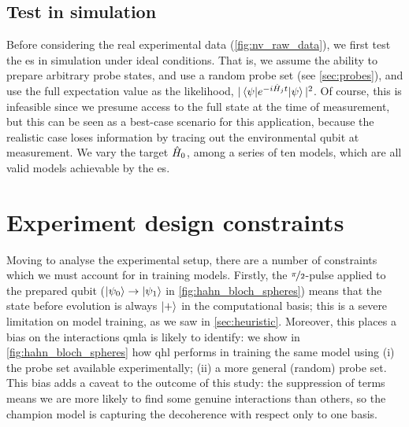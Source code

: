 \par 
\subsection{Test in simulation}
Before considering the real experimental data (\cref{fig:nv_raw_data}), 
    we first test the \gls{es} in simulation under ideal conditions. 
That is, we assume the ability to prepare arbitrary \gls{probe} states, 
    and use a random \gls{probe} set (see \cref{sec:probes}),
    and use the full expectation value as the likelihood, $|\braket{\psi | e^{-i \hat{H}_j t} | \psi}|^2$.
Of course, this is infeasible since we presume access to the full state at the time of measurement, 
    but this can be seen as a best-case scenario for this application, 
    because the realistic case loses information by tracing out the environmental qubit at measurement.
We vary the target $\hat{H}_0$, among a series of ten models,
    which are all valid models achievable by the \gls{es}. 


\section{Experiment design constraints}\label{sec:nv_constraints}
Moving to analyse the experimental setup, there are a number of constraints which we must account for in 
    training models. 
Firstly, the $\nicefrac{\pi}{2}$-pulse applied to the prepared qubit ($\ket{\psi_0} \rightarrow \ket{\psi_1}$ in \cref{fig:hahn_bloch_spheres})
    means that the state before evolution is always $\ket{+}$ in the computational basis;
    this is a severe limitation on model training, as we saw in \cref{sec:heuristic}. 
Moreover, this places a bias on the interactions \gls{qmla} is likely to identify:
    we show in \cref{fig:hahn_bloch_spheres} how \gls{qhl} performs in training the same model using 
    (i) the \gls{probe} set available experimentally; (ii) a more general (random) \gls{probe} set. 
This bias adds a caveat to the outcome of this study:
    the suppression of terms means we are more likely to find some genuine interactions than others, 
    so the \gls{champion model} is capturing the decoherence with respect only to one basis.
\par

